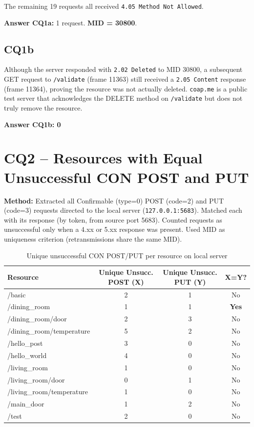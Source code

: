 \documentclass[12pt,a4paper]{article}
\begin{document}
The remaining 19 requests all received \texttt{4.05 Method Not Allowed}.

\textbf{Answer CQ1a:} 1 request. \textbf{MID = 30800}.

\subsection{CQ1b}

Although the server responded with \texttt{2.02 Deleted} to MID 30800, a subsequent
GET request to \texttt{/validate} (frame 11363) still received a \texttt{2.05 Content}
response (frame 11364), proving the resource was not actually deleted.
\texttt{coap.me} is a public test server that acknowledges the DELETE method on
\texttt{/validate} but does not truly remove the resource.

\textbf{Answer CQ1b: 0}

\section{CQ2 -- Resources with Equal Unsuccessful CON POST and PUT}

\textbf{Method:} Extracted all Confirmable (type=0) POST (code=2) and PUT (code=3) requests
directed to the local server (\texttt{127.0.0.1:5683}). Matched each with its response
(by token, from source port 5683). Counted requests as unsuccessful only when a
4.xx or 5.xx response was present. Used MID as uniqueness criterion (retransmissions
share the same MID).

\begin{table}[h]
\centering
\begin{tabular}{@{}lccc@{}}
\toprule
Resource & Unique Unsucc. POST (X) & Unique Unsucc. PUT (Y) & X=Y? \\
\midrule
/basic                      & 2 & 1 & No  \\
/dining\_room               & 1 & 1 & \textbf{Yes} \\
/dining\_room/door          & 2 & 3 & No  \\
/dining\_room/temperature   & 5 & 2 & No  \\
/hello\_post                & 3 & 0 & No  \\
/hello\_world               & 4 & 0 & No  \\
/living\_room               & 1 & 0 & No  \\
/living\_room/door          & 0 & 1 & No  \\
/living\_room/temperature   & 1 & 0 & No  \\
/main\_door                 & 1 & 2 & No  \\
/test                       & 2 & 0 & No  \\
\bottomrule
\end{tabular}
\caption{Unique unsuccessful CON POST/PUT per resource on local server}
\end{table}
\end{document}
